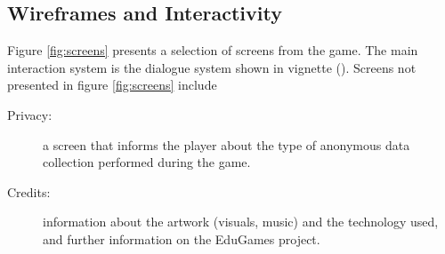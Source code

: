 \documentclass[a4paper,11pt]{article}
\begin{document}
\subsection{Wireframes and Interactivity}\label{interactivity}
Figure \ref{fig:screens} presents a selection of screens from the game. The main interaction system is the dialogue system shown in vignette (). Screens not presented in figure \ref{fig:screens} include
\begin{description}
  \item[Privacy:] a screen that informs the player about the type of anonymous data collection performed during the game.
  \item[Credits:] information about the artwork (visuals, music) and the technology used, and further information on the EduGames project.
\end{description}
\end{document}
